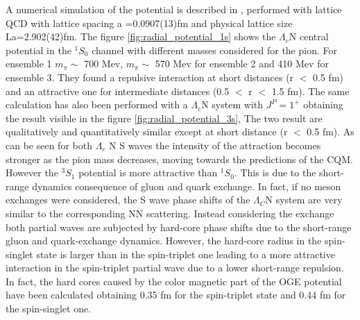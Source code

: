 \documentclass[12pt,a4paper]{book}
\begin{document}
	
	A numerical simulation of the potential is described in \cite{MIYAMOTO2018113}, performed with lattice QCD with lattice spacing a =0.0907(13)fm and physical lattice size La=2.902(42)fm. The figure \ref{fig:radial_potential_1s} shows the $\Lambda_c$N central potential in the $^{1}S_0$ channel with different masses considered for the pion. For ensemble 1 $m_\pi \sim$ 700 Mev, $m_\pi \sim$ 570 Mev for ensemble 2 and 410 Mev for ensemble 3. They found a repulsive interaction at short distances (r $<$ 0.5 fm) and an attractive one for intermediate distances (0.5 $<$ r $<$ 1.5 fm). The same calculation has also been performed with a $\Lambda_c$N system with $J^P=1^+$ obtaining the result visible in the figure \ref{fig:radial_potential_3s}, 
	The two result are qualitatively and quantitatively similar except at short distance (r $<$ 0.5 fm). As can be seen for both $\Lambda_c$ N S waves the intensity of the attraction becomes stronger as the pion mass decreases, moving towards the predictions of the CQM. However the $^{3}S_1$ potential is more attractive than $^{1}S_0$. This is due to the short-range dynamics consequence of gluon and quark exchange. In fact, if no meson exchanges were considered, the S wave phase shifts of the $\Lambda_C$N system are very similar to the corresponding NN scattering. Instead considering the exchange both partial waves are subjected by hard-core phase shifts due to the short-range gluon and quark-exchange dynamics. However, the hard-core radius in the spin-singlet state is larger than in the spin-triplet one leading to a more attractive interaction in the spin-triplet partial wave due to a lower short-range repulsion. In fact, the hard cores caused by the color magnetic part of the OGE potential have been calculated obtaining 0.35 fm for the spin-triplet state and 0.44 fm for the spin-singlet one.
	
\end{document}
